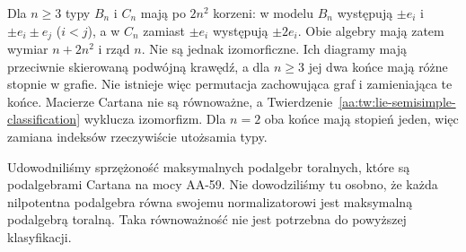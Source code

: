 \begin{przyklad}
\label{aa:prz:lie-bc-classification}
Dla $n\ge3$ typy $B_n$ i $C_n$ mają po $2n^2$ korzeni: w modelu $B_n$ występują $\pm e_i$ i $\pm e_i\pm e_j$ ($i<j$), a w $C_n$ zamiast $\pm e_i$ występują $\pm2e_i$. Obie algebry mają zatem wymiar $n+2n^2$ i rząd $n$. Nie są jednak izomorficzne. Ich diagramy mają przeciwnie skierowaną podwójną krawędź, a dla $n\ge3$ jej dwa końce mają różne stopnie w grafie. Nie istnieje więc permutacja zachowująca graf i zamieniająca te końce. Macierze Cartana nie są równoważne, a Twierdzenie~\ref{aa:tw:lie-semisimple-classification} wyklucza izomorfizm. Dla $n=2$ oba końce mają stopień jeden, więc zamiana indeksów rzeczywiście utożsamia typy.
\end{przyklad}

\begin{uwaga}
Udowodniliśmy sprzężoność maksymalnych podalgebr toralnych, które są podalgebrami Cartana na mocy AA-59. Nie dowodziliśmy tu osobno, że każda nilpotentna podalgebra równa swojemu normalizatorowi jest maksymalną podalgebrą toralną. Taka równoważność nie jest potrzebna do powyższej klasyfikacji.
\end{uwaga}
